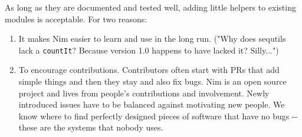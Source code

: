 As long as they are documented and tested well, adding little helpers to
existing modules is acceptable. For two reasons:

\begin{enumerate}
\def\labelenumi{\arabic{enumi}.}
\tightlist
\item
  It makes Nim easier to learn and use in the long run. ("Why does
  sequtils lack a \texttt{countIt}? Because version 1.0 happens to have
  lacked it? Silly...")
\item
  To encourage contributions. Contributors often start with PRs that add
  simple things and then they stay and also fix bugs. Nim is an open
  source project and lives from people's contributions and involvement.
  Newly introduced issues have to be balanced against motivating new
  people. We know where to find perfectly designed pieces of software
  that have no bugs -\/- these are the systems that nobody uses.
\end{enumerate}
